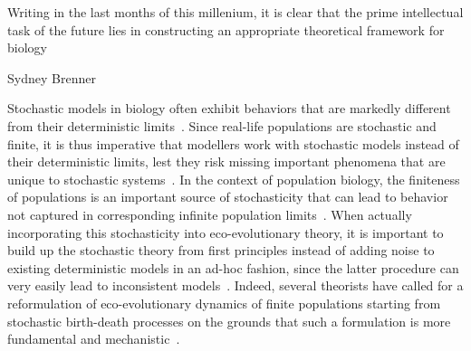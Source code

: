 \epigraph{\justifying Writing in the last months of this millenium, it is clear that the prime intellectual task of the future lies in constructing an appropriate theoretical framework for biology}{Sydney Brenner~\citep{brenner_theoretical_1999}}

Stochastic models in biology often exhibit behaviors that are markedly different from their deterministic limits~\citep{jafarpour_noise-induced_2017,boettiger_noise_2018,jhawar_noise-induced_2020,coomer_noise_2022}. Since real-life populations are stochastic and finite, it is thus imperative that modellers work with stochastic models instead of their deterministic limits, lest they risk missing important phenomena that are unique to stochastic systems~\citep{black_stochastic_2012,hastings_transients_2004,shoemaker_integrating_2020,schreiber_does_2022}. In the context of population biology, the finiteness of populations is an important source of stochasticity that can lead to behavior not captured in corresponding infinite population limits~\citep{black_stochastic_2012,rogers_demographic_2012,debarre_evolutionary_2016,delong_stochasticity_2023}. When actually incorporating this stochasticity into eco-evolutionary theory, it is important to build up the stochastic theory from first principles instead of adding noise to existing deterministic models in an ad-hoc fashion, since the latter procedure can very easily lead to inconsistent models~\citep{strang_how_2019}. Indeed, several theorists have called for a reformulation of eco-evolutionary dynamics of finite populations starting from stochastic birth-death processes on the grounds that such a formulation is more fundamental and mechanistic~\citep{metcalf_why_2007,geritz_mathematical_2012,doebeli_towards_2017}.


